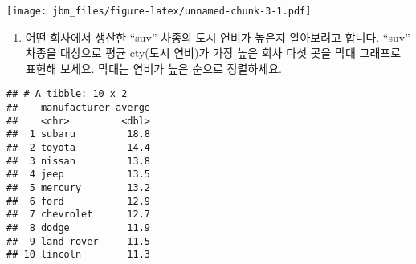 \documentclass[]{article}
\newenvironment{Shaded}{\begin{snugshade}}{\end{snugshade}}
\newcommand{\DataTypeTok}[1]{\textcolor[rgb]{0.13,0.29,0.53}{#1}}
\newcommand{\KeywordTok}[1]{\textcolor[rgb]{0.13,0.29,0.53}{\textbf{#1}}}
\newcommand{\NormalTok}[1]{#1}
\newcommand{\OperatorTok}[1]{\textcolor[rgb]{0.81,0.36,0.00}{\textbf{#1}}}
\newcommand{\OtherTok}[1]{\textcolor[rgb]{0.56,0.35,0.01}{#1}}
\newcommand{\StringTok}[1]{\textcolor[rgb]{0.31,0.60,0.02}{#1}}
\providecommand{\tightlist}{%
  \setlength{\itemsep}{0pt}\setlength{\parskip}{0pt}}
\begin{document}
\texttt{[image: jbm\_files/figure-latex/unnamed-chunk-3-1.pdf]}

\begin{enumerate}
\def\labelenumi{\arabic{enumi}.}
\setcounter{enumi}{2}
\tightlist
\item
  어떤 회사에서 생산한 ``suv'' 차종의 도시 연비가 높은지 알아보려고
  합니다. ``suv'' 차종을 대상으로 평균 cty(도시 연비)가 가장 높은 회사
  다섯 곳을 막대 그래프로 표현해 보세요. 막대는 연비가 높은 순으로
  정렬하세요.
\end{enumerate}

\begin{Shaded}
\end{Shaded}

\begin{verbatim}
## # A tibble: 10 x 2
##    manufacturer averge
##    <chr>         <dbl>
##  1 subaru         18.8
##  2 toyota         14.4
##  3 nissan         13.8
##  4 jeep           13.5
##  5 mercury        13.2
##  6 ford           12.9
##  7 chevrolet      12.7
##  8 dodge          11.9
##  9 land rover     11.5
## 10 lincoln        11.3
\end{verbatim}
\end{document}
